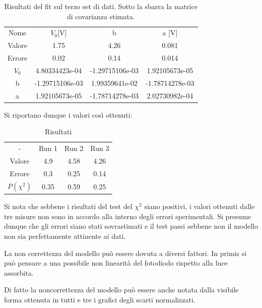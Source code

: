 \documentclass[a4paper,10pt]{article}
\begin{document}
\begin{table}[H]
	\centering
	\begin{tabular}{cccc}
	Nome	&	$ V_0 $[V] &  b      & a [V]\\
	Valore  &  1.75  & 4.26 & 0.081\\
	Errore	& 0.02 & 0.14 & 0.014\\ 
\hline 
	$V_0$ & 4.80334423e-04 & -1.29715106e-03  & 1.92105673e-05\\
 	b     & -1.29715106e-03 &  1.99359641e-02 & -1.78714278e-03\\
 	a     &  1.92105673e-05 & -1.78714278e-03 &  2.02730982e-04\\
\end{tabular}
\caption{Risultati del fit sul terzo set di dati. Sotto la sbarra la matrice di covarianza stimata.}
\label{tab:s6}
\end{table}


Si riportano dunque i valori così ottenuti:

\begin{table}[H]
	\centering
	\begin{tabular}{cccc}
    - & Run 1 & Run 2 & Run 3\\
Valore & 4.9 & 4.58 & 4.26\\
Errore & 0.3& 0.25 & 0.14\\
$P(\chi^2)$ & 0.35 & 0.59 & 0.25\\
\end{tabular}
\caption{Risultati}
\label{tab:s6}
\end{table}

Si nota che sebbene i risultati del test del $\chi^2$ siano positivi, i valori ottenuti dalle tre misure non sono in accordo alla interno degli errori sperimentali. Si presume dunque che gli errori siano stati sovrastimati e il test passi sebbene non il modello non sia perfettamente attinente ai dati. 

La non correttezza del modello può essere dovuta a diversi fattori. In primis si può pensare a una possibile non linearità del fotodiodo rispetto alla luce assorbita. 

Di fatto la noncorrettezza del modello può essere anche notata dalla visibile forma ottenuta in tutti e tre i grafici degli scarti normalizzati.
\end{document}
